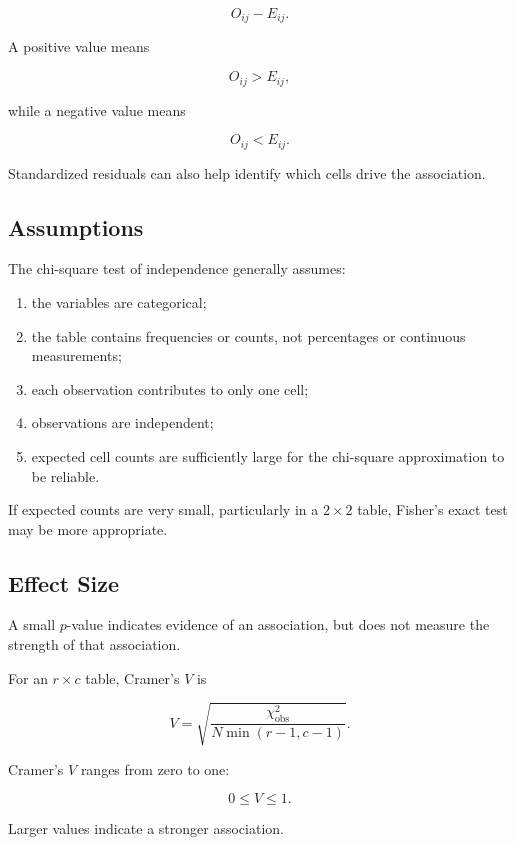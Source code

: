 \documentclass[11pt]{article}
\begin{document}
\[
O_{ij}-E_{ij}.
\]

A positive value means

\[
O_{ij}>E_{ij},
\]

while a negative value means

\[
O_{ij}<E_{ij}.
\]

Standardized residuals can also help identify which cells drive the
association.

\subsection{Assumptions}

The chi-square test of independence generally assumes:

\begin{enumerate}[noitemsep]
    \item the variables are categorical;

    \item the table contains frequencies or counts, not percentages or
    continuous measurements;

    \item each observation contributes to only one cell;

    \item observations are independent;

    \item expected cell counts are sufficiently large for the
    chi-square approximation to be reliable.
\end{enumerate}

If expected counts are very small, particularly in a \(2\times2\)
table, Fisher's exact test may be more appropriate.

\subsection{Effect Size}

A small \(p\)-value indicates evidence of an association, but does not
measure the strength of that association.

For an \(r\times c\) table, Cramer's \(V\) is

\[
\boxed{
V
=
\sqrt{
\frac{
\chi^2_{\mathrm{obs}}
}{
N\min(r-1,c-1)
}
}.
}
\]

Cramer's \(V\) ranges from zero to one:

\[
0\leq V\leq1.
\]

Larger values indicate a stronger association.
\end{document}
